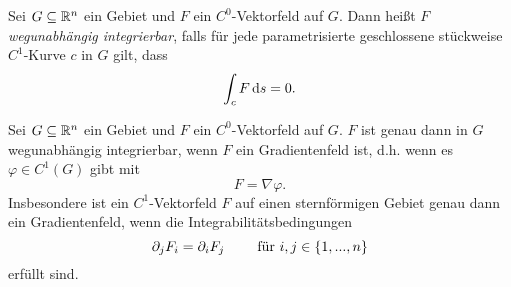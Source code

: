 \documentclass[
pdftex,
oneside,
headsepline,
11pt, 
]{scrreprt}
\begin{document}
\begin{de}
	Sei $G\subseteq \mathbb{R}^n$ ein Gebiet und $F$ ein $C^0$-Vektorfeld auf $G$. Dann heißt $F$ \textit{wegunabhängig integrierbar}, falls für jede parametrisierte geschlossene stückweise $C^1$-Kurve $c$ in $G$ gilt, dass \[ \int_c F \mathop{}\!\mathrm{d} s=0. \]
\end{de}
\begin{theo}
	Sei $G\subseteq \mathbb{R}^n$ ein Gebiet und $F$ ein $C^0$-Vektorfeld auf $G$. $F$ ist genau dann in $G$ wegunabhängig integrierbar, wenn $F$ ein Gradientenfeld ist, d.h. wenn es $\varphi\in C^1(G)$ gibt mit \[ F=\nabla\varphi.\] Insbesondere ist ein $C^1$-Vektorfeld $F$ auf einen sternförmigen Gebiet genau dann ein Gradientenfeld, wenn die Integrabilitätsbedingungen \[ \partial_{j}F_i=\partial_iF_j \qquad \textnormal{ für } i,j\in\left\lbrace1,...,n\right\rbrace \] erfüllt sind.
\end{theo}
\end{document}
